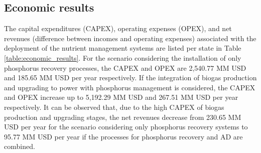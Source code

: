 \documentclass[authoryear]{elsarticle}
\begin{document}


\subsection{Economic results}
The capital expenditures (CAPEX), operating expenses (OPEX), and net revenues (difference between incomes and operating expenses) associated with the deployment of the nutrient management systems are listed per state in Table \ref{table:economic_results}. For the scenario considering the installation of only phosphorus recovery processes, the CAPEX and OPEX are 2,540.77 MM USD and 185.65 MM USD per year respectively. If the integration of biogas production and upgrading to power with phosphorus management is considered, the CAPEX and OPEX increase up to 5,192.29 MM USD and 267.51 MM USD per year respectively. It can be observed that, due to the high CAPEX of biogas production and upgrading stages, the net revenues decrease from 230.65 MM USD per year for the scenario considering only phosphorus recovery systems to 95.77 MM USD per year if the processes for phosphorus recovery and AD are combined.
\end{document}
